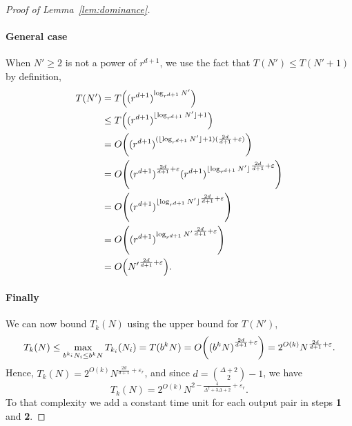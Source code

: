\begin{proof}[Proof of Lemma~\ref{lem:dominance}]
\paragraph{General case}
When $N' \ge 2$ is not a power of $r^{d+1}$, we use the fact that
$T(N') \le T(N'+1)$ by definition,
\begin{align*}
	T(N')
	&=
	T\mleft({(r^{d+1})}^{\log_{r^{d+1}} N'}\mright)
	\\
	&\le
	T\mleft({(r^{d+1})}^{\lfloor\log_{r^{d+1}} N'\rfloor + 1}\mright)
	\\
	&=
	O\mleft({(r^{d+1})}^{(\lfloor\log_{r^{d+1}} N'\rfloor + 1
	)(\frac{2d}{d+1}+\varepsilon)}\mright)
	\\
	&=
	O\mleft({(r^{d+1})}^{\frac{2d}{d+1}+\varepsilon}
	{{(r^{d+1})}^{\lfloor\log_{r^{d+1}} N'\rfloor}}^{\frac{2d}{d+1}+\varepsilon}\mright)
	\\
	&=
	O\mleft({{(r^{d+1})}^{\lfloor\log_{r^{d+1}}
	N'\rfloor}}^{\frac{2d}{d+1}+\varepsilon}\mright)
	\\
	&=
	O\mleft({{(r^{d+1})}^{\log_{r^{d+1}}
	N'}}^{\frac{2d}{d+1}+\varepsilon}\mright)
	\\
	&=
	O\mleft({N'}^{\frac{2d}{d+1}+\varepsilon}\mright).
\end{align*}
\paragraph{Finally} We can now bound $T_k(N)$ using the upper bound for
$T(N')$,
\begin{displaymath}
	T_{k}(N)
	\le
	\max_{b^{k_i} N_i \le b^{k} N} T_{k_i}(N_i)
	=
	T(b^{k} N)
	=
	O\mleft({(b^{k} N)}^{\frac{2d}{d+1}+\varepsilon}\mright)
	=
	2^{O(k)}{N}^{\frac{2d}{d+1}+\varepsilon}.
\end{displaymath}
Hence,
$T_k(N) = 2^{O(k)}N^{\frac{2d}{d+1}+\varepsilon_r}$,
and since $d=\binom{\Delta+2}{2}-1$, we have
\begin{displaymath}
	T_k(N) = 2^{O(k)}N^{2-\frac{4}{{\Delta}^2+3\Delta+2}+\varepsilon_r}.
\end{displaymath}
To that complexity we add a constant time unit for each output
pair in steps \textbf{1} and \textbf{2}.
\end{proof}

